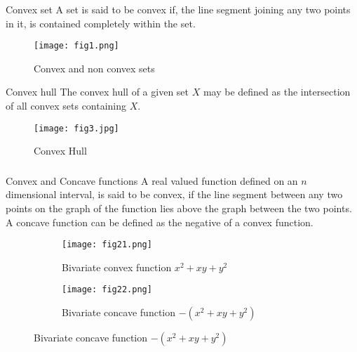 \documentclass{beamer}
\begin{document}
\begin{frame}
\frametitle{}
\begin{block}{Convex set}
A set is said to be convex if, the line segment joining any two points in it, is contained completely within the set.
\begin{figure}[h!]
\centering
\texttt{[image: fig1.png]}
\caption{Convex and non convex sets}
\label{ex}
\end{figure}
\end{block}
\begin{block}{Convex hull}
The convex hull of a given set $X$ may be defined as the intersection of all convex sets containing $X$.
\begin{figure}[h!]
\centering
\texttt{[image: fig3.jpg]}
\caption{Convex Hull}
\label{ex}
\end{figure}
\end{block}
\end{frame}

\begin{frame}
\frametitle{}
\begin{block}{Convex and Concave functions}
A real valued function defined on an $n$ dimensional interval, is said to be convex, if the line segment between any two points on the graph of the function lies above the graph between the two points. A concave function can be defined as the negative of a convex function.
\begin{figure}
    \centering
    \begin{subfigure}[b!]{0.45\linewidth}
    \centering
    \texttt{[image: fig21.png]}
    \caption{Bivariate convex function $x^{2}+xy+y^{2}$} 
    \label{fig:img21}
    \end{subfigure}
    \begin{subfigure}[b!]{0.45\linewidth}
    \centering
    \texttt{[image: fig22.png]}
    \caption{Bivariate concave function $-(x^{2}+xy+y^{2})$}
    \label{fig:img22}
    \end{subfigure}
\end{figure}
\end{block}
\end{frame}
\end{document}
